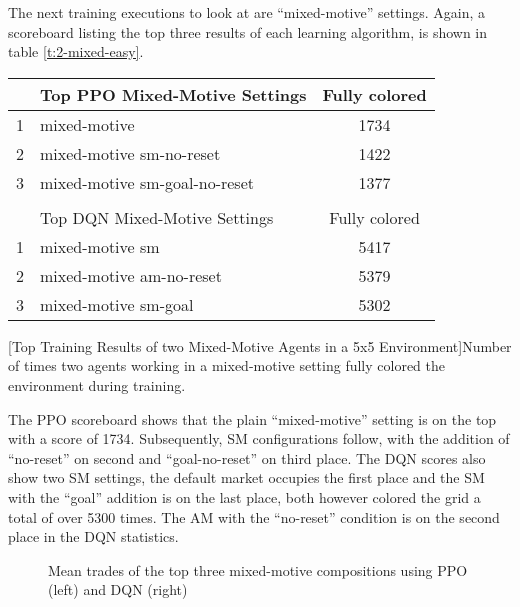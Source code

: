 The next training executions to look at are ``mixed-motive'' settings. Again, a scoreboard listing the top three results of each learning algorithm, is shown in table \ref{t:2-mixed-easy}.
\begin{center}
    \begin{tabular}{clc}\hline
         & Top PPO Mixed-Motive Settings & Fully colored \\ \hline
        {\small 1} & mixed-motive & 1734 \\
        {\small 2} & mixed-motive sm-no-reset & 1422 \\
        {\small 3} & mixed-motive sm-goal-no-reset & 1377 \\ \hline
         &   \\ \hline
         & Top DQN Mixed-Motive Settings & Fully colored \\ \hline
        {\small 1} & mixed-motive sm & 5417 \\
        {\small 2} & mixed-motive am-no-reset & 5379 \\
        {\small 3} & mixed-motive sm-goal & 5302 \\ \hline
        \end{tabular}
        [Top Training Results of two Mixed-Motive Agents in a 5x5 Environment]{Number of times two agents working in a mixed-motive setting fully colored the environment during training.}\label{t:2-mixed-easy}
    \end{center}

The PPO scoreboard shows that the plain ``mixed-motive'' setting is on the top with a score of 1734. Subsequently, SM configurations follow, with the addition of ``no-reset'' on second and ``goal-no-reset'' on third place. The DQN scores also show two SM settings, the default market occupies the first place and the SM with the ``goal'' addition is on the last place, both however colored the grid a total of over 5300 times. The AM with the ``no-reset'' condition is on the second place in the DQN statistics.

\begin{figure}[hpbt]
    \centering
    \hspace{0.01\textwidth}
    \caption[Mean Trades of the Top Mixed-Motive Modes in a 5x5 Environment]{Mean trades of the top three mixed-motive compositions using PPO (left) and DQN (right)}
    \label{fig:multipic_plots_mixed_easy}
\end{figure}


